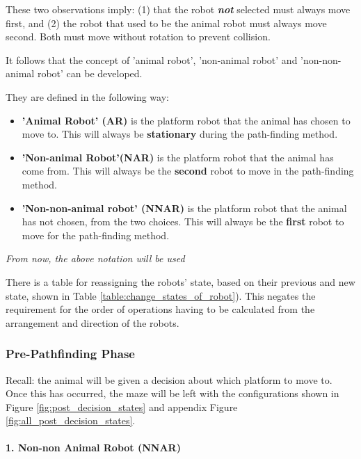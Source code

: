 These two observations imply: (1) that the robot \textbf{\textit{not}} selected must always move first, and (2) the robot that used to be the animal robot must always move second. Both must move without rotation to prevent collision.

It follows that the concept of 'animal robot', 'non-animal robot' and 'non-non-animal robot' can be developed.
\begin{tcolorbox}
They are defined in the following way:
\begin{itemize}
    \item \textbf{'Animal Robot' (AR)} is the platform robot that the animal has chosen to move to. This will always be \textbf{stationary} during the path-finding method.
    \item \textbf{'Non-animal Robot'(NAR)} is the platform robot that the animal has come from. This will always be the \textbf{second} robot to move in the path-finding method.
    \item \textbf{'Non-non-animal robot' (NNAR)} is the platform robot that the animal has not chosen, from the two choices. This will always be the \textbf{first} robot to move for the path-finding method.
\end{itemize}
\begin{center}
\textit{From now, the above notation will be used}
\end{center}
\end{tcolorbox}
There is a table for reassigning the robots' state, based on their previous and new state, shown in Table \ref{table:change_states_of_robot}).
This negates the requirement for the order of operations having to be calculated from the arrangement and direction of the robots.

\subsubsection{Pre-Pathfinding Phase}
\label{section:pre_pathfinding}

Recall: the animal will be given a decision about which platform to move to. Once this has occurred, the maze will be left with the configurations shown in Figure \ref{fig:post_decision_states} and appendix Figure  \ref{fig:all_post_decision_states}.



\paragraph{1. Non-non Animal Robot (NNAR)}

